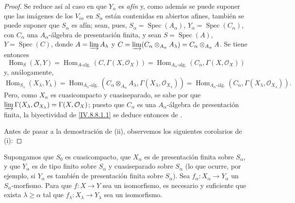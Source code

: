 \begin{proof}
Se reduce así al caso en que $Y_\alpha$ es \emph{afín} y, como además se puede suponer que las imágenes de los $V_{i\alpha}$ en $S_\alpha$ están contenidas en abiertos afines, también se puede suponer que $S_\alpha$ es afín; sean, pues, $S_\alpha=\operatorname{Spec}(A_\alpha)$, $Y_\alpha=\operatorname{Spec}(C_\alpha)$, con $C_\alpha$ una $A_\alpha$-álgebra de presentación finita, y sean $S=\operatorname{Spec}(A)$, $Y=\operatorname{Spec}(C)$, donde $A=\varinjlim A_\lambda$ y $C=\varinjlim(C_\alpha\otimes_{A_\alpha}A_\lambda)=
C_\alpha\otimes_{A_\alpha}A$.
Se tiene entonces
\[
\operatorname{Hom}_S(X,Y)=
\operatorname{Hom}_{A\text{-alg.}}(C,\Gamma(X,\mathcal O_X))=
\operatorname{Hom}_{A_\alpha\text{-alg.}}(C_\alpha,\Gamma(X,\mathcal O_X))
\]
 y, análogamente,
\[
\operatorname{Hom}_{S_\lambda}(X_\lambda,Y_\lambda)=
\operatorname{Hom}_{A_\lambda\text{-alg.}}
(C_\alpha\otimes_{A_\alpha}A_\lambda,\Gamma(X_\lambda,\mathcal O_{X_\lambda}))=
\operatorname{Hom}_{A_\alpha\text{-alg.}}
(C_\alpha,\Gamma(X_\lambda,\mathcal O_{X_\lambda})).
\]
Pero, como $X_\alpha$ es cuasicompacto y cuasiseparado, se sabe por  que $\varinjlim\Gamma(X_\lambda,\mathcal O_{X_\lambda})=
\Gamma(X,\mathcal O_X)$; puesto que $C_\alpha$ es una $A_\alpha$-álgebra de presentación finita, la biyectividad de \eqref{IV.8.8.1.1} se deduce entonces de .

Antes de pasar a la demostración de (ii), observemos los siguientes corolarios de (i):
\end{proof}

\begin{corollary}[8.8.2.4]
\label{IV.8.8.2.4-fr}
Supongamos que $S_0$ es cuasicompacto, que $X_\alpha$ es de presentación finita sobre $S_\alpha$, y que $Y_\alpha$ es de tipo finito sobre $S_\alpha$ y cuasiseparado sobre $S_\alpha$ \textup{(lo que ocurre, por ejemplo, si $Y_\alpha$ es también}
\textup{de presentación finita sobre $S_\alpha$)}.
Sea $f_\alpha:X_\alpha\to Y_\alpha$ un $S_\alpha$-morfismo.
Para que $f:X\to Y$ sea un isomorfismo, es necesario y suficiente que exista $\lambda\geq\alpha$ tal que $f_\lambda:X_\lambda\to Y_\lambda$ sea un isomorfismo.
\end{corollary}

